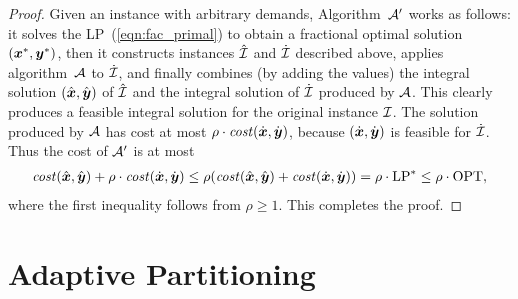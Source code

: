 \documentclass[11pt]{article}
\begin{document}

\begin{proof}
  Given an {\FTFP} instance with arbitrary demands, Algorithm~${\cal A}'$ works
as follows: it solves the LP~(\ref{eqn:fac_primal}) to obtain a
  fractional optimal solution $(\boldsymbol{x}^\ast,\boldsymbol{y}^\ast)$, then it constructs
  instances ${\hat{\cal I}}$ and ${\dot{\cal I}}$ described above,  applies
  algorithm~${\cal A}$ to ${\dot{\cal I}}$, and finally combines (by adding
  the values) the integral solution $(\hat{\boldsymbol{x}}, \hat{\boldsymbol{y}})$ of
  ${\hat{\cal I}}$ and the integral solution of ${\dot{\cal I}}$ produced
  by ${\cal A}$. This clearly produces a feasible integral
  solution for the original instance $\mathcal{I}$.
The solution produced by ${\cal A}$ has cost at most
$\rho\cdot{\it cost}(\dot{\boldsymbol{x}},\dot{\boldsymbol{y}})$, because $(\dot{\boldsymbol{x}},\dot{\boldsymbol{y}})$
is feasible for ${\dot{\cal I}}$. Thus the cost of ${\cal A}'$ is at most
% 
 \begin{align*}
 {\it cost}(\hat{\boldsymbol{x}}, \hat{\boldsymbol{y}}) + \rho\cdot{\it cost}(\dot{\boldsymbol{x}},\dot{\boldsymbol{y}})
	\le
 \rho({\it cost}(\hat{\boldsymbol{x}}, \hat{\boldsymbol{y}}) + {\it cost}(\dot{\boldsymbol{x}},\dot{\boldsymbol{y}}))
		= \rho\cdot\mbox{\rm LP}^\ast \le \rho\cdot\mbox{\rm OPT},
  \end{align*}
%
where the first inequality follows from $\rho\geq 1$. This completes
the proof.
\end{proof}


\section{Adaptive Partitioning}
\label{sec: adaptive partitioning}
\end{document}
